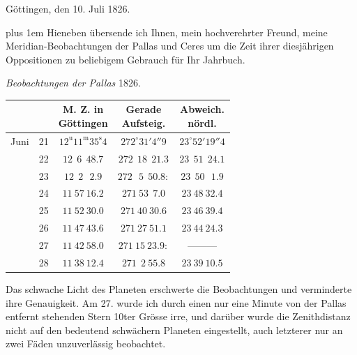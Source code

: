 \begin{flushright}
Göttingen, den 10. Juli 1826.
\end{flushright}

\begingroup\rightskip=0pt plus 1em\relax
Hieneben übersende ich Ihnen, mein hochverehrter Freund, meine Meridian-Beobachtungen
der Pallas und Ceres um die Zeit ihrer diesjährigen Oppositionen zu beliebigem Gebrauch
für Ihr Jahrbuch.
\par\endgroup

\begin{center}
\emph{Beobachtungen der Pallas} 1826.
\end{center}

\begin{center}
\begingroup\small\setlength{\tabcolsep}{4pt}
\begin{tabular}{lr|c|c|c}
 & & \shortstack{M. Z. in\\Göttingen} & \shortstack{Gerade\\Aufsteig.} & \shortstack{Abweich.\\nördl.} \\
\hline
Juni & 21 & $12^{\mathrm u}11^{\mathrm m}35^{\mathrm s}4$ & $272^\circ 31' 4''9$ & $23^\circ 52' 19''4$ \\
 & 22 & $12\ \ 6\ \ 48.7$ & $272\ \ 18\ \ 21.3$ & $23\ \ 51\ \ 24.1$ \\
 & 23 & $12\ \ 2\ \ \ 2.9$ & $272\ \ \ 5\ \ 50.8:$ & $23\ \ 50\ \ \ 1.9$ \\
 & 24 & $11\ 57\ 16.2$ & $271\ 53\ \ 7.0$ & $23\ 48\ 32.4$ \\
 & 25 & $11\ 52\ 30.0$ & $271\ 40\ 30.6$ & $23\ 46\ 39.4$ \\
 & 26 & $11\ 47\ 43.6$ & $271\ 27\ 51.1$ & $23\ 44\ 24.3$ \\
 & 27 & $11\ 42\ 58.0$ & $271\ 15\ 23.9:$ & ---\quad---\quad--- \\
 & 28 & $11\ 38\ 12.4$ & $271\ \ 2\ 55.8$ & $23\ 39\ 10.5$ \\
\end{tabular}
\endgroup
\end{center}

Das schwache Licht des Planeten erschwerte die Beobachtungen und verminderte ihre
Genauigkeit. Am 27. wurde ich durch einen nur eine Minute von der Pallas entfernt
stehenden Stern 10ter Grösse
 irre, und darüber wurde die Zenithdistanz nicht auf den bedeutend schwächern Planeten
eingestellt, auch letzterer nur an zwei Fäden unzuverlässig beobachtet.



